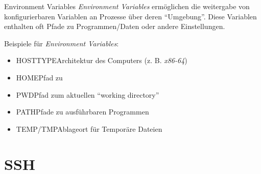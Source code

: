 \documentclass{setbeamer}
\begin{document}
\begin{frame}{Environment Variables}
    \emph{Environment Variables} ermöglichen die weitergabe von konfigurierbaren Variablen an Prozesse über deren ``Umgebung''. Diese Variablen enthalten oft Pfade zu Programmen/Daten oder andere Einstellungen.

    \vspace{0.3cm}

    Beispiele für \emph{Environment Variables}:
    \begin{itemize}
        \item HOSTTYPE\textemdash Architektur des Computers (z. B. \emph{x86-64})
        \item HOME\textemdash Pfad zu 
        \item PWD\textemdash Pfad zum aktuellen ``working directory''
        \item PATH\textemdash Pfade zu ausführbaren Programmen
        \item TEMP/TMP\textemdash Ablageort für Temporäre Dateien
    \end{itemize}

\end{frame}

\section{SSH}
\end{document}
